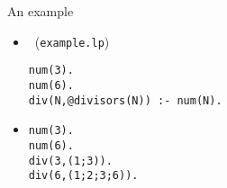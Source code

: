 \begin{frame}[fragile]{An example}
  \bigskip
  \begin{itemize}
  \item<1->  \ (\texttt{example.lp})
\begin{lstlisting}
num(3).
num(6).
div(N,@divisors(N)) :- num(N).
\end{lstlisting}
  \bigskip
  \item<2-> 
\begin{lstlisting}
num(3).
num(6).
div(3,(1;3)).
div(6,(1;2;3;6)).
\end{lstlisting}
  \end{itemize}
\end{frame}
